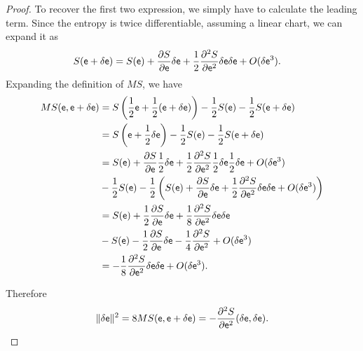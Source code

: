 \begin{proof}
	To recover the first two expression, we simply have to calculate the leading term. Since the entropy is twice differentiable, assuming a linear chart, we can expand it as
\begin{equation}
	\begin{aligned}
		S(\mathsf{e} + \delta \mathsf{e}) &= S(\mathsf{e}) + \frac{\partial S}{\partial \mathsf{e}} \delta \mathsf{e} + \frac{1}{2} \frac{\partial^2 S}{\partial \mathsf{e}^2} \delta \mathsf{e} \delta \mathsf{e} + O(\delta \mathsf{e} ^3).
	\end{aligned}
\end{equation}
Expanding the definition of $MS$, we have
\begin{equation}
	\begin{aligned}
		MS(\mathsf{e}, \mathsf{e} + \delta \mathsf{e}) &= S\left(\frac{1}{2} \mathsf{e} + \frac{1}{2}(\mathsf{e} + \delta \mathsf{e}) \right) - \frac{1}{2} S(\mathsf{e}) - \frac{1}{2} S(\mathsf{e}+\delta \mathsf{e}) \\
		&=  S\left(\mathsf{e} + \frac{1}{2} \delta \mathsf{e} \right) - \frac{1}{2} S(\mathsf{e}) - \frac{1}{2} S(\mathsf{e}+\delta \mathsf{e}) \\
		&= S(\mathsf{e}) + \frac{\partial S}{\partial \mathsf{e}} \frac{1}{2}\delta \mathsf{e} + \frac{1}{2} \frac{\partial^2 S}{\partial \mathsf{e}^2} \frac{1}{2}\delta \mathsf{e} \frac{1}{2}\delta \mathsf{e} + O(\delta \mathsf{e} ^3) \\
		&- \frac{1}{2} S(\mathsf{e}) - \frac{1}{2} \left( S(\mathsf{e}) + \frac{\partial S}{\partial \mathsf{e}} \delta \mathsf{e} + \frac{1}{2} \frac{\partial^2 S}{\partial \mathsf{e}^2} \delta \mathsf{e} \delta \mathsf{e} + O(\delta \mathsf{e} ^3) \right) \\
		&= S(\mathsf{e}) + \frac{1}{2} \frac{\partial S}{\partial \mathsf{e}} \delta \mathsf{e} + \frac{1}{8} \frac{\partial^2 S}{\partial \mathsf{e}^2} \delta \mathsf{e} \delta \mathsf{e} \\
		&- S(\mathsf{e}) - \frac{1}{2} \frac{\partial S}{\partial \mathsf{e}} \delta \mathsf{e} - \frac{1}{4} \frac{\partial^2 S}{\partial \mathsf{e}^2} + O(\delta \mathsf{e} ^3) \\
		&= - \frac{1}{8} \frac{\partial^2 S}{\partial \mathsf{e}^2} \delta \mathsf{e} \delta \mathsf{e} + O(\delta \mathsf{e} ^3).
	\end{aligned}
\end{equation}

Therefore
$$ \lVert \delta \mathsf{e} \rVert^2 = 8 MS(\mathsf{e}, \mathsf{e} + \delta \mathsf{e}) = -  \frac{\partial^2 S}{\partial \mathsf{e}^2} (\delta \mathsf{e}, \delta \mathsf{e}).$$


\end{proof}
